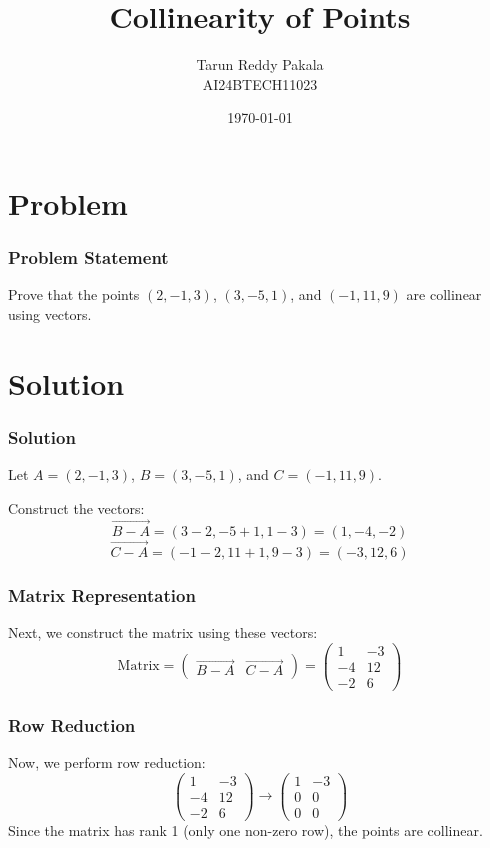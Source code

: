 \documentclass{beamer}
\title{Collinearity of Points}
\author{Tarun Reddy Pakala \\ AI24BTECH11023}
\date{\today}
\providecommand{\brak}[1]{\ensuremath{\left(#1\right)}}
\theoremstyle{remark}
\numberwithin{equation}{section}
\begin{document}
\begin{frame}
\titlepage
\end{frame}

\section{Problem}
\begin{frame}
\frametitle{Problem Statement}
Prove that the points \(\brak{2,-1,3}\), \(\brak{3,-5,1}\), and \(\brak{-1,11,9}\) are collinear using vectors.
\end{frame}

\section{Solution}
\begin{frame}
\frametitle{Solution}
Let \( A = \brak{2, -1, 3} \), \( B = \brak{3, -5, 1} \), and \( C = \brak{-1, 11, 9} \).

Construct the vectors:
\[
\overrightarrow{B-A} = \brak{3-2, -5+1, 1-3} = \brak{1, -4, -2}
\]
\[
\overrightarrow{C-A} = \brak{-1-2, 11+1, 9-3} = \brak{-3, 12, 6}
\]
\end{frame}

\begin{frame}
\frametitle{Matrix Representation}
Next, we construct the matrix using these vectors:
\[
\text{Matrix} = 
\begin{pmatrix}
\overrightarrow{B-A} & \overrightarrow{C-A}
\end{pmatrix}
= 
\begin{pmatrix}
1 & -3 \\
-4 & 12 \\
-2 & 6
\end{pmatrix}
\]
\end{frame}

\begin{frame}
\frametitle{Row Reduction}
Now, we perform row reduction:
\[
\begin{pmatrix}
1 & -3 \\
-4 & 12 \\
-2 & 6
\end{pmatrix}
\rightarrow
\begin{pmatrix}
1 & -3 \\
0 & 0 \\
0 & 0
\end{pmatrix}
\]
Since the matrix has rank 1 (only one non-zero row), the points are collinear.
\end{frame}
\end{document}
